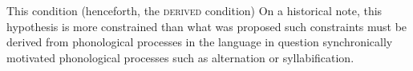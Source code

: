 This condition (henceforth, the \textsc{derived} condition) 
On a historical note, this hypothesis is more constrained than what was proposed
such constraints must be derived from phonological processes in the language in question
synchronically motivated phonological processes such as alternation or syllabification.





